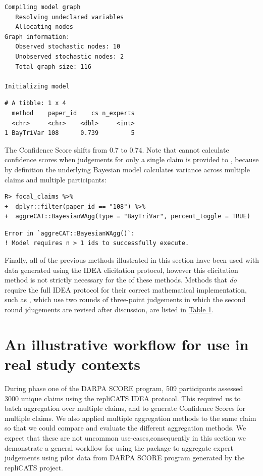\documentclass[article]{jss}
\newcommand{\fct}[1]{\code{#1()}}
\begin{document}
\begin{verbatim}
Compiling model graph
   Resolving undeclared variables
   Allocating nodes
Graph information:
   Observed stochastic nodes: 10
   Unobserved stochastic nodes: 2
   Total graph size: 116

Initializing model
\end{verbatim}

\begin{verbatim}
# A tibble: 1 x 4
  method    paper_id    cs n_experts
  <chr>     <chr>    <dbl>     <int>
1 BayTriVar 108      0.739         5
\end{verbatim}

The Confidence Score shifts from 0.7 to 0.74. Note that
\fct{BayesianWAgg} cannot calculate confidence scores when judgements
for only a single claim is provided to \fct{expert\_judgements}, because
by definition the underlying Bayesian model calculates variance across
multiple claims and multiple participants:

\begin{verbatim}
R> focal_claims %>% 
+  dplyr::filter(paper_id == "108") %>% 
+  aggreCAT::BayesianWAgg(type = "BayTriVar", percent_toggle = TRUE)
\end{verbatim}

\begin{verbatim}
Error in `aggreCAT::BayesianWAgg()`:
! Model requires n > 1 ids to successfully execute.
\end{verbatim}

Finally, all of the previous methods illustrated in this section have
been used with data generated using the IDEA elicitation protocol,
however this elicitation method is not strictly necessary for the of
these methods. Methods that \emph{do} require the full IDEA protocol for
their correct mathematical implementation, such as \fct{ShiftingWAgg},
which use two rounds of three-point judgements in which the second round
jdugements are revised after discussion, are listed in
\protect\hyperlink{fig-method_summary_table}{Table 1}.

\hypertarget{an-illustrative-workflow-for-use-in-real-study-contexts}{%
\section{An illustrative workflow for use in real study
contexts}\label{an-illustrative-workflow-for-use-in-real-study-contexts}}

During phase one of the DARPA SCORE program, 509 participants assessed
3000 unique claims using the repliCATS IDEA protocol. This required us
to batch aggregation over multiple claims, and to generate Confidence
Scores for multiple claims. We also applied multiple aggregation methods
to the same claim so that we could compare and evaluate the different
aggregation methods. We expect that these are not uncommon
use-cases,consequently in this section we demonstrate a general workflow
for using the  package to aggregate expert judgements
using pilot data from DARPA SCORE program generated by the repliCATS
project.
\end{document}
